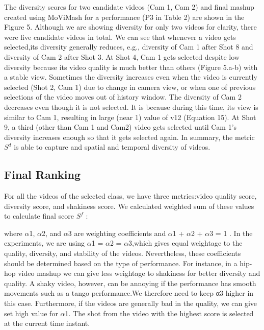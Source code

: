 \documentclass{sig-alternate}
\begin{document}
The diversity scores for two candidate videos (Cam 1, Cam 2) and final mashup created using MoViMash for a performance (P3 in Table 2) are shown in the Figure 5. Although we are showing diversity for only two videos for clarity, there were five candidate videos in total. We can see that whenever a video gets selected,its diversity generally reduces, e.g., diversity of Cam 1 after Shot 8 and diversity of Cam 2 after Shot 3. At Shot 4, Cam 1 gets selected despite low diversity because its video quality is much better than others (Figure 5.a-b) with a stable view. Sometimes the diversity increases even when the video is currently selected (Shot 2, Cam 1) due to change in camera view, or when one of previous selections of the video moves out of history window. The diversity of Cam 2 decreases even though it is not selected. It is because during this time, its view is similar to Cam 1, resulting in large (near 1) value of v12 (Equation 15). At Shot 9, a third (other than Cam 1 and Cam2) video gets selected until Cam 1’s diversity increases enough so that it gets selected again. In summary, the metric $S^d$ is able to capture and spatial and temporal diversity of videos.

\subsection{Final Ranking}

For all the videos of the selected class, we have three metrics:video quality score, diversity score, and shakiness score. We calculated weighted sum of these values to calculate final score $S^f$ :

where  $\alpha$1, $\alpha$2, and $\alpha$3 are weighting coefficients and $ \alpha$1 + $\alpha$2 + $\alpha$3 = 1 . In the experiments, we are using $\alpha$1 = $\alpha$2 = $\alpha$3,which gives equal weightage to the quality, diversity, and stability of the videos. Nevertheless, these coefficients should be determined based on the type of performance. For instance, in a hip-hop video mashup we can give less weightage to shakiness for better diversity and quality. A shaky video, however, can be annoying if the performance has smooth movements such as a tango performance.We therefore need to keep α3 higher in this case. Furthermore, if the videos are generally bad in the quality, we can give set high value for $\alpha$1. The shot from the video with the highest score is selected at the current time instant.
\end{document}
